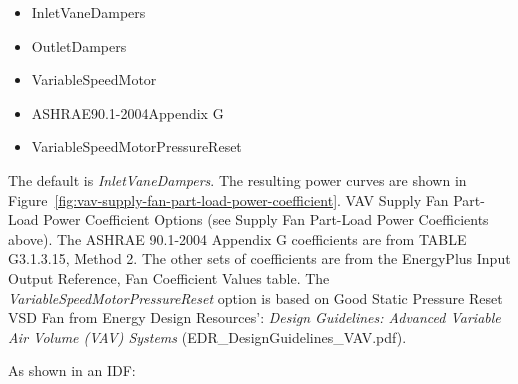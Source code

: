 \begin{itemize}
\item
  InletVaneDampers
\item
  OutletDampers
\item
  VariableSpeedMotor
\item
  ASHRAE90.1-2004Appendix G
\item
  VariableSpeedMotorPressureReset
\end{itemize}

The default is \emph{InletVaneDampers}. The resulting power curves are shown in Figure~\ref{fig:vav-supply-fan-part-load-power-coefficient}. VAV Supply Fan Part-Load Power Coefficient Options (see Supply Fan Part-Load Power Coefficients above). The ASHRAE 90.1-2004 Appendix G coefficients are from TABLE G3.1.3.15, Method 2. The other sets of coefficients are from the EnergyPlus Input Output Reference, Fan Coefficient Values table. The \emph{VariableSpeedMotorPressureReset} option is based on Good Static Pressure Reset VSD Fan from Energy Design Resources': \emph{Design Guidelines: Advanced Variable Air Volume (VAV) Systems} (EDR\_DesignGuidelines\_VAV.pdf).

As shown in an IDF:


